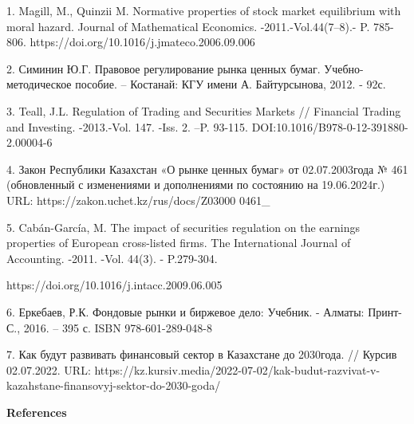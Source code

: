 \begin{noparindent}
1.
Magill, M., Quinzii M. Normative properties of stock market
equilibrium with moral hazard. Journal of Mathematical Economics.
-2011.-Vol.44(7--8).- P. 785-806.
https://doi.org/10.1016/j.jmateco.2006.09.006

2.
Симинин Ю.Г. Правовое регулирование рынка ценных бумаг.
Учебно-методическое пособие. -- Костанай: КГУ имени А. Байтурсынова,
2012. - 92с.

3.
Teall, J.L. Regulation of Trading and Securities Markets // Financial
Trading and Investing. -2013.-Vol. 147. -Iss. 2. --P. 93-115.
DOI:10.1016/B978-0-12-391880-2.00004-6

4.
Закон Республики Казахстан «О рынке ценных бумаг» от 02.07.2003года №
461 (обновленный с изменениями и дополнениями по состоянию на
19.06.2024г.) URL: https://zakon.uchet.kz/rus/docs/Z03000 0461\_

5.
Cabán-García, M. The impact of securities regulation on the earnings
properties of European cross-listed firms. The International Journal
of Accounting. -2011. -Vol. 44(3). - P.279-304.

https://doi.org/10.1016/j.intacc.2009.06.005

6.
Еркебаев, Р.К. Фондовые рынки и биржевое дело: Учебник. - Алматы:
Принт-С., 2016. -- 395 с. ISBN 978-601-289-048-8

7.
Как будут развивать финансовый сектор в Казахстане до 2030года. //
Курсив 02.07.2022.
URL:
https://kz.kursiv.media/2022-07-02/kak-budut-razvivat-v-kazahstane-finansovyj-sektor-do-2030-goda/
\end{noparindent}

\begin{center}
{\bfseries References}
\end{center}

